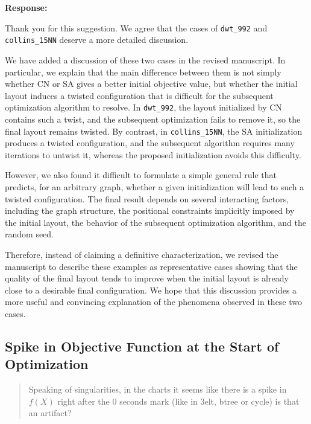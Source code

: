 \documentclass[11pt]{article}
\newcommand{\reviewercomment}[1]{%
  \begin{quote}
  \color{blue}
  #1
  \end{quote}
}
\newenvironment{response}{%
  \noindent\textbf{Response:}%
}{%
  \medskip
}
\begin{document}
\begin{response}
  Thank you for this suggestion. We agree that the cases of \texttt{dwt\_992} and \texttt{collins\_15NN} deserve a more detailed discussion.

  We have added a discussion of these two cases in the revised manuscript. In particular, we explain that the main difference between them is not simply whether \textsf{CN} or \textsf{SA} gives a better initial objective value, but whether the initial layout induces a twisted configuration that is difficult for the subsequent optimization algorithm to resolve. In \texttt{dwt\_992}, the layout initialized by \textsf{CN} contains such a twist, and the subsequent optimization fails to remove it, so the final layout remains twisted. By contrast, in \texttt{collins\_15NN}, the \textsf{SA} initialization produces a twisted configuration, and the subsequent algorithm requires many iterations to untwist it, whereas the proposed initialization avoids this difficulty.

  However, we also found it difficult to formulate a simple general rule that predicts, for an arbitrary graph, whether a given initialization will lead to such a twisted configuration. The final result depends on several interacting factors, including the graph structure, the positional constraints implicitly imposed by the initial layout, the behavior of the subsequent optimization algorithm, and the random seed.

  Therefore, instead of claiming a definitive characterization, we revised the manuscript to describe these examples as representative cases showing that the quality of the final layout tends to improve when the initial layout is already close to a desirable final configuration.
  We hope that this discussion provides a more useful and convincing explanation of the phenomena observed in these two cases.
\end{response}

\subsection{Spike in Objective Function at the Start of Optimization}

\reviewercomment{
  Speaking of singularities, in the charts it seems like there is a spike in \(f(X)\) right after the 0 seconds mark (like in 3elt, btree or cycle) is that an artifact?
}
\end{document}
